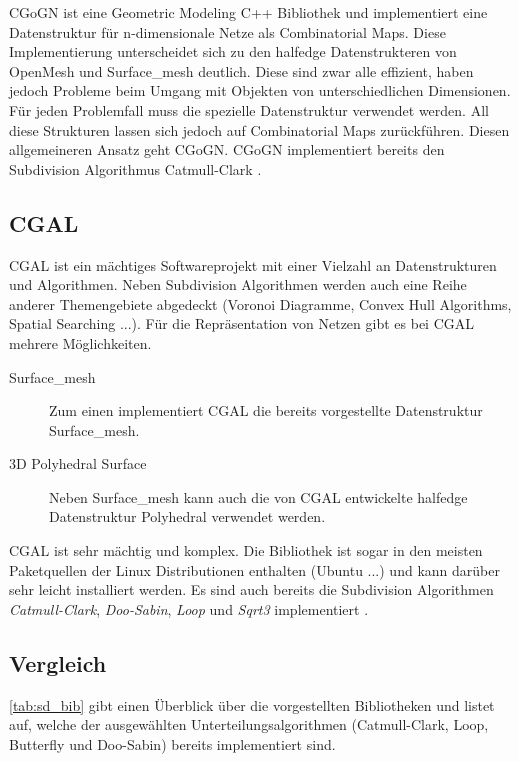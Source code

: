 CGoGN ist eine Geometric Modeling C++ Bibliothek und implementiert eine Datenstruktur für n-dimensionale Netze als Combinatorial Maps.
Diese Implementierung unterscheidet sich zu den halfedge Datenstrukteren von OpenMesh und Surface\_mesh deutlich.
Diese sind zwar alle effizient, haben jedoch Probleme beim Umgang mit Objekten von unterschiedlichen Dimensionen.
Für jeden Problemfall muss die spezielle Datenstruktur verwendet werden.
All diese Strukturen lassen sich jedoch auf Combinatorial Maps zurückführen.
Diesen allgemeineren Ansatz geht CGoGN.
CGoGN implementiert bereits den Subdivision Algorithmus Catmull-Clark \cite{CGoGN.27.07.2015}. 

\subsection{\acf{CGAL}}

\ac{CGAL} ist ein mächtiges Softwareprojekt mit einer Vielzahl an Datenstrukturen und Algorithmen.
Neben Subdivision Algorithmen werden auch eine Reihe anderer Themengebiete abgedeckt (Voronoi Diagramme, Convex Hull Algorithms, Spatial Searching ...).
Für die Repräsentation von Netzen gibt es bei \acs{CGAL} mehrere Möglichkeiten.

\begin{description}
 \item[Surface\_mesh] Zum einen implementiert \acs{CGAL} die bereits vorgestellte Datenstruktur Surface\_mesh.
 \item[3D Polyhedral Surface] Neben Surface\_mesh kann auch die von \acs{CGAL} entwickelte halfedge Datenstruktur Polyhedral verwendet werden.
\end{description}

\acs{CGAL} ist sehr mächtig und komplex. Die Bibliothek ist sogar in den meisten Paketquellen der Linux Distributionen enthalten (Ubuntu ...)
und kann darüber sehr leicht installiert werden.
Es sind auch bereits die Subdivision Algorithmen \emph{Catmull-Clark}, \emph{Doo-Sabin}, \emph{Loop} und \emph{Sqrt3} implementiert \cite{CGAL.27.07.2015}.

\subsection{Vergleich}

\autoref{tab:sd_bib} gibt einen Überblick über die vorgestellten Bibliotheken und listet auf, welche der ausgewählten Unterteilungsalgorithmen
(Catmull-Clark, Loop, Butterfly und Doo-Sabin) bereits implementiert sind.

